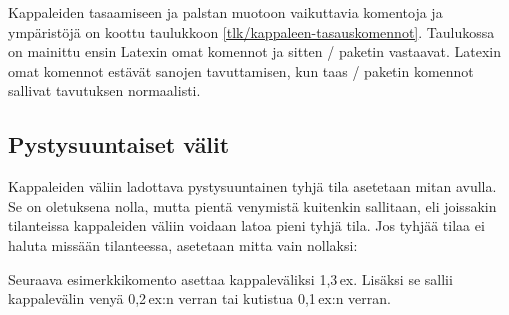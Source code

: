 
Kappaleiden tasaamiseen ja palstan muotoon vaikuttavia komentoja ja
ympäristöjä on koottu taulukkoon \ref{tlk/kappaleen-tasauskomennot}.
Taulukossa on mainittu ensin Latexin omat komennot ja sitten
\-/ paketin vastaavat. Latexin omat komennot
estävät sanojen tavuttamisen, kun taas \-/ paketin
komennot sallivat tavutuksen normaalisti.

\subsection{Pystysuuntaiset välit}
\label{luku/pystysuuntaiset-välit}

Kappaleiden väliin ladottava pystysuuntainen tyhjä tila asetetaan mitan
 avulla. Se on oletuksena nolla, mutta pientä venymistä
kuitenkin sallitaan, eli joissakin tilanteissa kappaleiden väliin
voidaan latoa pieni tyhjä tila. Jos tyhjää tilaa ei haluta missään
tilanteessa, asetetaan mitta vain nollaksi:

\begin{koodilohkosis}
\setlength{\parskip}{0ex}
\end{koodilohkosis}

\noindent
Seuraava esimerkkikomento asettaa kappaleväliksi 1,3\,ex. Lisäksi se
sallii kappalevälin venyä 0,2\,ex:n verran tai kutistua 0,1\,ex:n
verran.

